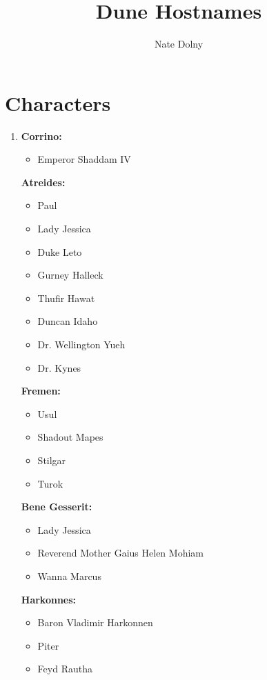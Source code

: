 \documentclass{article}
\title{\textbf{Dune Hostnames}}
\author{Nate Dolny}
\date{}
\begin{document}
\maketitle

\section{Characters}
\begin{enumerate}

\item[] \textbf{Corrino:}
\begin{itemize}
\item Emperor Shaddam IV
\end{itemize}


\textbf{Atreides:}
\begin{itemize}
\item Paul
\item Lady Jessica
\item Duke Leto
\item Gurney Halleck 
\item Thufir Hawat
\item Duncan Idaho 
\item Dr. Wellington Yueh
\item Dr. Kynes 
\end{itemize}


\textbf{Fremen:}
\begin{itemize}
\item Usul
\item Shadout Mapes
\item Stilgar 
\item Turok 
\end{itemize}


\textbf{Bene Gesserit:}
\begin{itemize}
\item Lady Jessica
\item Reverend Mother Gaius Helen Mohiam
\item Wanna Marcus  
\end{itemize}


\textbf{Harkonnes:}
\begin{itemize}
\item Baron Vladimir Harkonnen 
\item Piter
\item Feyd Rautha
\end{itemize}

\end{enumerate}
\end{document}
